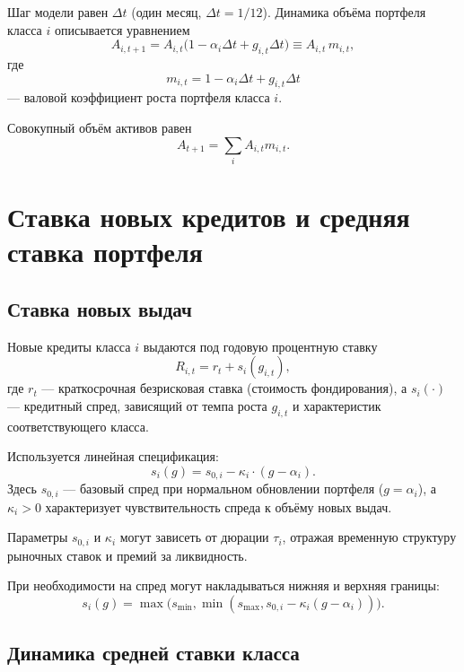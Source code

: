 \documentclass[11pt,a4paper]{article}
\newcommand{\1}{\mathbf{1}}
\begin{document}
Шаг модели равен $\Delta t$ (один месяц, $\Delta t = 1/12$).
Динамика объёма портфеля класса $i$ описывается уравнением
\begin{equation}
    A_{i,t+1} = A_{i,t} \bigl(1 - \alpha_i \Delta t + g_{i,t} \Delta t \bigr)
    \equiv A_{i,t} \, m_{i,t},
\end{equation}
где
\[
m_{i,t}=1-\alpha_i\Delta t + g_{i,t}\Delta t
\]
--- валовой коэффициент роста портфеля класса $i$.

Совокупный объём активов равен
\[
A_{t+1} = \sum_i A_{i,t} m_{i,t}.
\]

\section{Ставка новых кредитов и средняя ставка портфеля}

\subsection{Ставка новых выдач}

Новые кредиты класса $i$ выдаются под годовую процентную ставку
\begin{equation}
    R_{i,t} = r_t + s_{i}(g_{i,t}),
\end{equation}
где $r_t$ --- краткосрочная безрисковая ставка (стоимость фондирования), а $s_i(\cdot)$ --- кредитный спред, зависящий от темпа роста $g_{i,t}$ и характеристик соответствующего класса.

Используется линейная спецификация:
\begin{equation}
    s_{i}(g) = s_{0,i} - \kappa_{i} \cdot (g - \alpha_{i}).
\end{equation}
Здесь $s_{0,i}$ --- базовый спред при нормальном обновлении портфеля ($g=\alpha_i$), а $\kappa_i>0$ характеризует чувствительность спреда к объёму новых выдач.

Параметры $s_{0,i}$ и $\kappa_i$ могут зависеть от дюрации $\tau_i$, отражая временную структуру рыночных ставок и премий за ликвидность.

При необходимости на спред могут накладываться нижняя и верхняя границы:
\begin{equation}
    s_{i}(g)=
    \max\bigl(s_{\min},
    \min(s_{\max},
    s_{0,i}-\kappa_i(g-\alpha_i))\bigr).
\end{equation}

\subsection{Динамика средней ставки класса}
\end{document}
